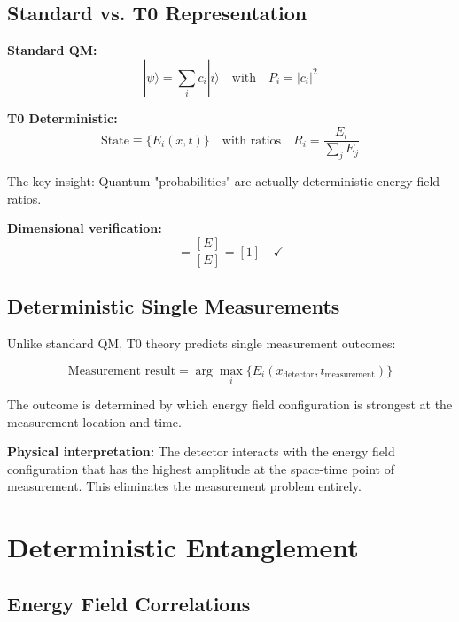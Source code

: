 \documentclass[12pt,a4paper]{report}
\begin{document}
\subsection{Standard vs. T0 Representation}
\label{subsec:standard_vs_t0}

\textbf{Standard QM:}
\begin{equation}
	|\psi\rangle = \sum_i c_i |i\rangle \quad \text{with} \quad P_i = |c_i|^2
\end{equation}

\textbf{T0 Deterministic:}
\begin{equation}
	\text{State} \equiv \{E_i(x,t)\} \quad \text{with ratios} \quad R_i = \frac{E_i}{\sum_j E_j}
\end{equation}

The key insight: Quantum "probabilities" are actually deterministic energy field ratios.

\textbf{Dimensional verification:}
\begin{equation}
	[R_i] = \frac{[E]}{[E]} = [1] \quad \checkmark
\end{equation}

\subsection{Deterministic Single Measurements}
\label{subsec:deterministic_measurements}

Unlike standard QM, T0 theory predicts single measurement outcomes:

\begin{equation}
	\text{Measurement result} = \arg\max_i\{E_i(x_{\text{detector}}, t_{\text{measurement}})\}
\end{equation}

The outcome is determined by which energy field configuration is strongest at the measurement location and time.

\textbf{Physical interpretation:}
The detector interacts with the energy field configuration that has the highest amplitude at the space-time point of measurement. This eliminates the measurement problem entirely.

\section{Deterministic Entanglement}
\label{sec:deterministic_entanglement}

\subsection{Energy Field Correlations}
\label{subsec:energy_field_correlations}
\end{document}
